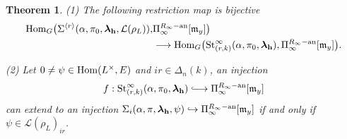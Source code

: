 \documentclass[SecEq,CM,GP]{degruyter-crelle} %
\theoremstyle{plain}
\newtheorem{thm}{Theorem}[section]
\newcommand{\hooklongrightarrow}{\lhook\joinrel\longrightarrow}
\newcommand{\ana}{{\rm an}}
\newcommand{\homo}{{\rm Hom}}
\newcommand{\lrr}{{\langle r\rangle}}
\newcommand{\lra}{\longrightarrow}
\newcommand{\st}{{\rm St}}
\newcommand{\bh}{{\mathbf{h}}}
\newcommand{\fm}{{\mathfrak{m}}}
\newcommand{\sL}{\mathcal L}
\begin{document}
\begin{thm}\label{thm: lgln-main}
(1) The following restriction map is bijective
\begin{equation}\label{equ: lgln-main}
	\begin{aligned}
		\homo_{G}\big(\Sigma^{\lrr}(\alpha,\pi_0,{\bm\lambda}_\bh, \sL(\rho_L)),& \Pi_{\infty}^{R_{\infty}-\ana}[\fm_y]\big) \\
		&\lra \homo_{G}\big(\st_{(r,k)}^{\infty}(\alpha,\pi_0,{\bm\lambda}_\bh), \Pi_{\infty}^{R_{\infty}-\ana}[\fm_y]\big).
	\end{aligned}
\end{equation}


\noindent
(2) Let $0\neq \psi\in \homo(L^{\times},E)$ and $ir\in \Delta_n(k)$, an injection
\begin{equation*}
	f: \st_{(r,k)}^{\infty}(\alpha,\pi_0,{\bm\lambda}_\bh)\hooklongrightarrow \Pi_{\infty}^{R_{\infty}-\ana}[\fm_y]   \end{equation*}
can extend to an injection $\Sigma_{i}(\alpha, \pi,{\bm\lambda}_\bh, \psi)\hookrightarrow \Pi_{\infty}^{R_{\infty}-\ana}[\fm_y]$ if and only if $\psi\in \sL(\rho_L)_{ir}$.
\end{thm}
\end{document}
